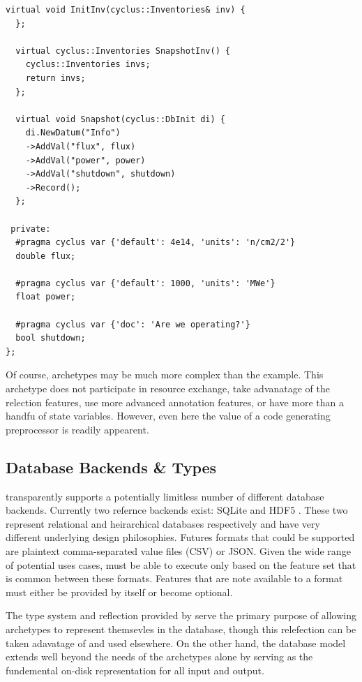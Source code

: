\begin{lstlisting}[caption={Simple Reactor Archetype After Preprocessing with \cycpp, 
                            line marker directives have been removed for space}, 
                   label=rx-eg-cycpp]
  virtual void InitInv(cyclus::Inventories& inv) {
  };

  virtual cyclus::Inventories SnapshotInv() {
    cyclus::Inventories invs;
    return invs;
  };

  virtual void Snapshot(cyclus::DbInit di) {
    di.NewDatum("Info")
    ->AddVal("flux", flux)
    ->AddVal("power", power)
    ->AddVal("shutdown", shutdown)
    ->Record();
  };

 private:
  #pragma cyclus var {'default': 4e14, 'units': 'n/cm2/2'}
  double flux;

  #pragma cyclus var {'default': 1000, 'units': 'MWe'}
  float power;

  #pragma cyclus var {'doc': 'Are we operating?'}
  bool shutdown;
};
\end{lstlisting}

Of course, archetypes may be much more complex than the  example.
This archetype does not participate in resource exchange, take advanatage of 
the relection features, use more advanced annotation features, or have more than 
a handfu of state variables.  However, even here the value of a code generating
preprocessor is readily appearent.

\subsection{Database Backends \& Types}

\Cyclus transparently supports a potentially limitless number of different database 
backends. Currently two refernce backends exist: SQLite \cite{owens2006definitive} 
and HDF5 \cite{folk2011overview}. These two represent relational and heirarchical 
databases respectively and have very different underlying design philosophies.
Futures formats that could be supported are plaintext comma-separated value files 
(CSV) or JSON.  Given the wide range of potential uses cases, \cyclus must be able 
to execute only based on the feature set that is common between these formats.
Features that are note available to a format must either be provided by \cyclus 
itself or become optional.

The type system and reflection provided by \cycpp serve the primary purpose of 
allowing archetypes to represent themsevles in the database, though this 
relefection can be taken adavatage of and used elsewhere. On the other hand, 
the database model extends well beyond the needs of the archetypes alone by 
serving as the fundemental on-disk representation for all input and output.

